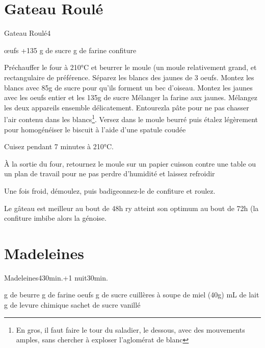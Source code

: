 {%
\section{Gateau Roulé}
\begin{recette}{Gateau Roulé}{4}{}{}
\begin{ingredients}
 œufs
+135 g de sucre
 g de farine
\ingredient confiture
\end{ingredients}

\begin{preparation}
\etape Préchauffer le four à 210°C et beurrer le moule (un moule relativement grand, et rectangulaire de 
préférence.
\etape Séparez les blancs des jaunes de 3 oeufs. 
\etape Montez les  blancs avec 85g de sucre pour qu'ils forment un bec d'oiseau.
\etape Montez les jaunes avec les oeufs entier et les 135g de sucre
\etape Mélanger la farine aux jaunes.
\etape Mélangez les deux appareils ensemble délicatement. \og Entourez\fg la pâte pour ne pas chasser l'air contenu dans les blancs\footnote{En gros, il faut faire le tour du 
saladier, le dessous, avec des mouvements amples, sans chercher à exploser l'aglomérat de blanc}.
\etape Versez dans le moule beurré puis étalez légèrement pour homogénéiser le biscuit à l’aide d’une spatule coudée
\end{preparation}

\begin{cuisson}
Cuisez pendant 7 minutes à 210°C.

À la sortie du four, retournez le moule sur un papier cuisson contre une table ou un plan de travail pour ne pas perdre d'humidité et laissez refroidir

Une fois froid, démoulez, puis badigeonnez-le de confiture et roulez.

\begin{remarque}
Le gâteau est meilleur au bout de 48h ry atteint son optimum au bout de 72h (la confiture imbibe alors la génoise.
\end{remarque}
\end{cuisson}
\end{recette}

\section{Madeleines}
\begin{recette}{Madeleines}{4}{30min.+1 nuit}{30min.}
\begin{ingredients}[36 madeleines]
 g de beurre
 g de farine
 oeufs
 g de sucre
 cuillères à soupe de miel (40g)
 mL de lait
 g de levure chimique
 sachet de sucre vanillé
\end{ingredients}


\end{recette}}
